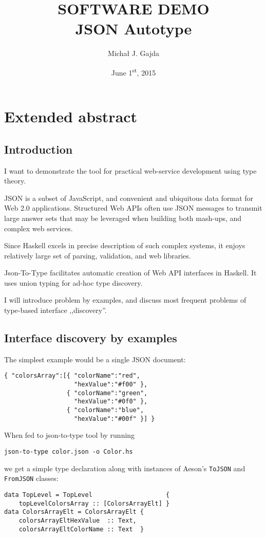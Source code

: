 \documentclass[11pt]{article}
\title{\textbf{{\large SOFTWARE DEMO}\\JSON Autotype\\
\vspace{5pt}{\large
Automatic bridge from untyped Web APIs
\\to typeful haven of Haskell}}}
\author{Micha\l{} J. Gajda}
\date{June 1\textsuperscript{st}, 2015}
\begin{document}
\maketitle

\section*{Extended abstract}
\subsection*{Introduction}
I want to demonstrate the tool for practical web-service development using type theory.

JSON is a subset of JavaScript, and convenient and ubiquitous data format for Web 2.0 applications. Structured Web APIs often use JSON messages to transmit large answer sets that may be leveraged when building both mash-ups, and complex web services.

Since Haskell excels in precise description of such complex systems, it enjoys relatively large set of parsing, validation, and web libraries.

Json-To-Type facilitates automatic creation of Web API interfaces in Haskell. It uses union typing for ad-hoc type discovery.

I will introduce problem by examples, and discuss most frequent problems of type-based interface ,,discovery''.

\subsection*{Interface discovery by examples}

The simplest example would be a single JSON document:

\begin{verbatim}
{ "colorsArray":[{ "colorName":"red",
                   "hexValue":"#f00" },
                 { "colorName":"green",
                   "hexValue":"#0f0" },
                 { "colorName":"blue",
                   "hexValue":"#00f" }] }
\end{verbatim}

When fed to json-to-type tool by running \begin{verbatim}json-to-type color.json -o Color.hs\end{verbatim} we get a simple type declaration along with instances of Aeson's \texttt{ToJSON} and \texttt{FromJSON} classes:

\begin{verbatim}
data TopLevel = TopLevel                    {
    topLevelColorsArray :: [ColorsArrayElt] }
data ColorsArrayElt = ColorsArrayElt {
    colorsArrayEltHexValue  :: Text,
    colorsArrayEltColorName :: Text  }
\end{verbatim}
\end{document}
